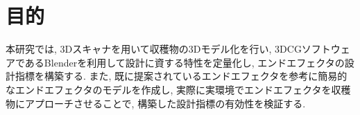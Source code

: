 \section{目的}
本研究では, 3Dスキャナを用いて収穫物の3Dモデル化を行い, 3DCGソフトウェアであるBlenderを利用して設計に資する特性を定量化し, エンドエフェクタの設計指標を構築する.
また, 既に提案されているエンドエフェクタを参考に簡易的なエンドエフェクタのモデルを作成し, 実際に実環境でエンドエフェクタを収穫物にアプローチさせることで, 構築した設計指標の有効性を検証する.
